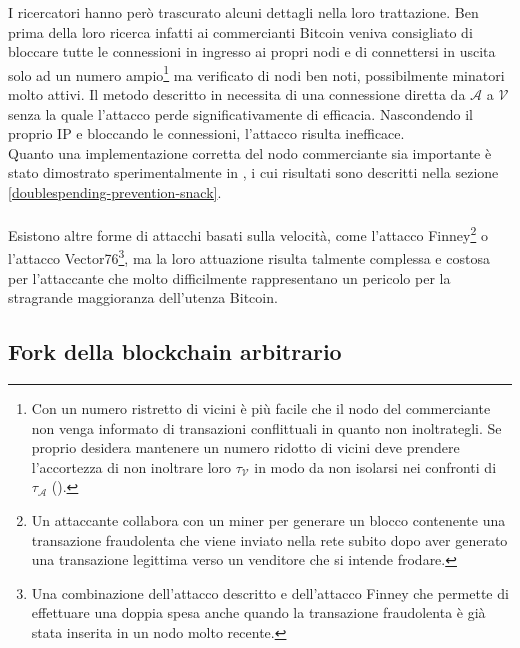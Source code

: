 I ricercatori hanno però trascurato alcuni dettagli nella loro trattazione. Ben prima della loro ricerca infatti ai commercianti Bitcoin veniva consigliato di bloccare tutte le connessioni in ingresso ai propri nodi e di connettersi in uscita solo ad un numero ampio\footnote{Con un numero ristretto di vicini è più facile che il nodo del commerciante non venga informato di transazioni conflittuali in quanto non inoltrategli. Se proprio desidera mantenere un numero ridotto di vicini deve prendere l'accortezza di non inoltrare loro $\tau_\mathcal{V}$ in modo da non isolarsi nei confronti di $\tau_\mathcal{A}$  (\cite{bitcoinsnack}).} ma verificato di nodi ben noti, possibilmente minatori molto attivi. Il metodo descritto in \cite{doublespendig_fast} necessita di una connessione diretta da $\mathcal{A}$ a $\mathcal{V}$ senza la quale l'attacco perde significativamente di efficacia. Nascondendo il proprio IP e bloccando le connessioni, l'attacco risulta inefficace. \\ Quanto una implementazione corretta del nodo commerciante sia importante è stato dimostrato sperimentalmente in \cite{bitcoinsnack}, i cui risultati sono descritti nella sezione \ref{doublespending-prevention-snack}.\\\\
Esistono altre forme di attacchi basati sulla velocità, come l'attacco Finney\footnote{Un attaccante collabora con un miner per generare un blocco contenente una transazione fraudolenta che viene inviato nella rete subito dopo aver generato una transazione legittima verso un venditore che si intende frodare.} o l'attacco Vector76\footnote{Una combinazione dell'attacco descritto e dell'attacco Finney che permette di effettuare una doppia spesa anche quando la transazione fraudolenta è già stata inserita in un nodo molto recente.}, ma la loro attuazione risulta talmente complessa e costosa per l'attaccante che molto difficilmente rappresentano un pericolo per la stragrande maggioranza dell'utenza Bitcoin.

\subsection{Fork della blockchain arbitrario}\label{attacchi-hashrate}


